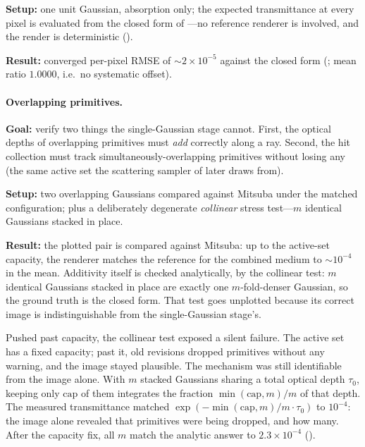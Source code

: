 \textbf{Setup:} one unit Gaussian,
absorption only; the expected transmittance at every pixel is evaluated from the closed form of
---no reference renderer is involved, and the render is deterministic
().

\textbf{Result:} converged per-pixel RMSE of $\sim\!2\times10^{-5}$ against the
closed form (; mean ratio $1.0000$, i.e.\ no systematic offset).

\paragraph{Overlapping primitives.} \textbf{Goal:} verify two things the single-Gaussian stage
cannot. First, the optical depths of overlapping primitives must \emph{add} correctly along a ray.
Second, the hit collection must track simultaneously-overlapping primitives without losing
any (the same active set the scattering sampler of  later draws from).

\textbf{Setup:} two overlapping Gaussians compared against Mitsuba under the matched
configuration; plus a deliberately degenerate \emph{collinear} stress test---$m$ identical Gaussians
stacked in place.

\textbf{Result:} the plotted pair is compared against Mitsuba: up to the active-set
capacity, the renderer matches the reference for the combined medium to $\sim\!10^{-4}$ in
the mean. Additivity itself is checked analytically, by the collinear test: $m$ identical
Gaussians stacked in place are exactly one $m$-fold-denser Gaussian, so the ground truth is
the closed form. That test goes unplotted because its correct image is indistinguishable
from the single-Gaussian stage's.

Pushed past capacity, the collinear test exposed a silent failure. The active set has a fixed
capacity; past it, old revisions dropped primitives without any warning, and the image stayed
plausible. The mechanism was still identifiable from the image alone. With $m$ stacked Gaussians sharing
a total optical depth $\tau_0$, keeping only $\text{cap}$ of them integrates the fraction
$\min(\text{cap},m)/m$ of that depth. The measured transmittance matched
$\exp(-\min(\text{cap},m)/m\cdot\tau_0)$ to $10^{-4}$: the image alone revealed that
primitives were being dropped, and how many. After the capacity fix, all $m$ match the analytic answer to
$2.3\times10^{-4}$ ().


